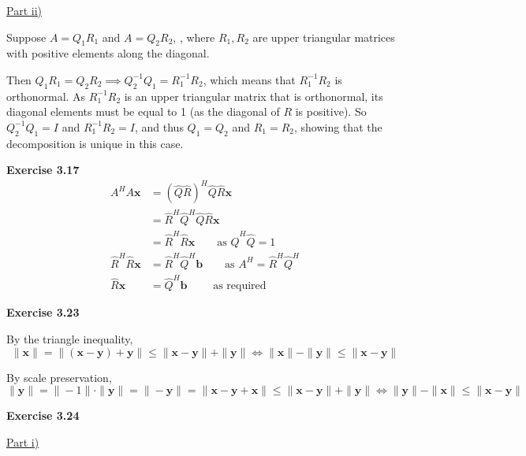 \documentclass[letterpaper,12pt]{article}
\newcommand{\vect}[1]{\mathbf{#1}}
\begin{document}
\underline{Part ii)} 

Suppose $A = Q_1 R_1$ and $A = Q_2 R_2$, , where $R_1, R_2$ are upper triangular matrices with positive elements along the diagonal.

Then $Q_1 R_1 = Q_2 R_2 \implies Q_2^{-1} Q_1 = R_1^{-1}R_2$, which means that $R_1^{-1}R_2$ is orthonormal. As $R_1^{-1}R_2$ is an upper triangular matrix that is orthonormal, its diagonal elements must be equal to 1 (as the diagonal of $R$ is positive). So $Q_2^{-1} Q_1 = I$ and $R_1^{-1}R_2 = I$, and thus $Q_1 = Q_2$ and $R_1 = R_2$, showing that the decomposition is unique in this case.

\textbf{Exercise 3.17}
\begin{align*}
  A^H A \vect{x} &= (\hat{Q} \hat{R})^H \hat{Q} \hat{R} \vect{x} \\
  &= \hat{R}^H \hat{Q}^H \hat{Q} \hat{R} \vect{x} \\
  &= \hat{R}^H \hat{R} \vect{x} \quad \quad \text{as }  \hat{Q}^H \hat{Q} = 1\\
  \hat{R}^H \hat{R} \vect{x} &= \hat{R}^H \hat{Q}^H \vect{b} \quad \quad \text{as } A^H = \hat{R}^H \hat{Q}^H \\
  \hat{R} \vect{x} &= \hat{Q}^H \vect{b} \quad \quad \text{ as required }
\end{align*}

\textbf{Exercise 3.23}

By the triangle inequality,
\begin{equation*}
  \|\vect{x}\| = \|(\vect{x} - \vect{y}) + \vect{y}\| \leq \|\vect{x} - \vect{y}\| + \|\vect{y}\|
  \Leftrightarrow \|\vect{x}\| - \|\vect{y}\| \leq \|\vect{x} - \vect{y}\|
\end{equation*}

By scale preservation,
\begin{equation*}
  \|\vect{y}\| = \|-1\| \cdot \|\vect{y}\| = \|-\vect{y}\| = \|\vect{x} - \vect{y} + \vect{x}\| \leq \|\vect{x} - \vect{y}\| + \|\vect{y}\|
  \Leftrightarrow \|\vect{y}\| - \|\vect{x}\| \leq \|\vect{x} - \vect{y}\|
\end{equation*}

\textbf{Exercise 3.24}

\underline{Part i)}
\end{document}
